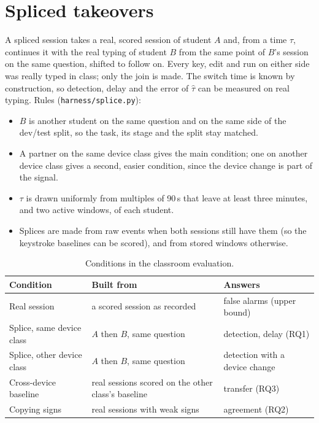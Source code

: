 \section{Spliced takeovers}
\label{sec:splicing}
A spliced session takes a real, scored session of student $A$ and, from a time $\tau$,
continues it with the real typing of student $B$ from the same point of $B$'s session on
the same question, shifted to follow on. Every key, edit and run on either side was
really typed in class; only the join is made. The switch time is known by construction,
so detection, delay and the error of $\hat\tau$ can be measured on real typing. Rules
(\texttt{harness/splice.py}):
\begin{itemize}
  \item $B$ is another student on the same question and on the same side of the
    dev/test split, so the task, its stage and the split stay matched.
  \item A partner on the same device class gives the main condition; one on another
    device class gives a second, easier condition, since the device change is part of
    the signal.
  \item $\tau$ is drawn uniformly from multiples of 90\,s that leave at least
    three minutes, and two active windows, of each student.
  \item Splices are made from raw events when both sessions still have them (so the
    keystroke baselines can be scored), and from stored windows otherwise.
\end{itemize}

\begin{table}[ht]
  \centering
  \caption{Conditions in the classroom evaluation.}
  \label{tab:conditions}
  \begin{tabular}{@{}lll@{}}
    \toprule
    Condition & Built from & Answers \\
    \midrule
    Real session & a scored session as recorded & false alarms (upper bound) \\
    Splice, same device class & $A$ then $B$, same question & detection, delay (RQ1) \\
    Splice, other device class & $A$ then $B$, same question & detection with a device change \\
    Cross-device baseline & real sessions scored on the other class's baseline & transfer (RQ3) \\
    Copying signs & real sessions with weak signs & agreement (RQ2) \\
    \bottomrule
  \end{tabular}
\end{table}

